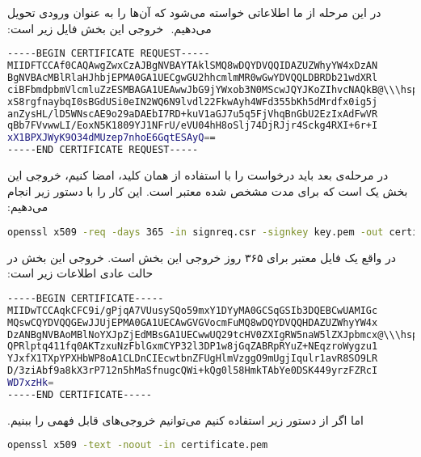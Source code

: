 ‫در این مرحله از ما اطلاعاتی خواسته می‌شود که آن‌ها را به عنوان ورودی تحویل می‌دهیم.
‫
‫خروجی این بخش فایل زیر است:
\begin{latin}
\begin{lstlisting}[language=bash]
-----BEGIN CERTIFICATE REQUEST-----
MIIDFTCCAf0CAQAwgZwxCzAJBgNVBAYTAklSMQ8wDQYDVQQIDAZUZWhyYW4xDzAN
BgNVBAcMBlRlaHJhbjEPMA0GA1UECgwGU2hhcmlmMR0wGwYDVQQLDBRDb21wdXRl
ciBFbmdpbmVlcmluZzESMBAGA1UEAwwJbG9jYWxob3N0MScwJQYJKoZIhvcNAQkB@\\\hspace*{4em}\large\vdots \setcounter{lstnumber}{14}@
xS8rgfnaybqI0sBGdUSi0eIN2WQ6N9lvdl22FkwAyh4WFd355bKh5dMrdfx0ig5j
anZysHL/lD5WNscAE9o29aDAEbI7RD+kuV1aGJ7u5q5FjVhqBnGbU2EzIxAdFwVR
qBb7FVvwwLI/EoxN5K1809YJ1NFrU/eVU04hH8oSlj74DjRJjr4Sckg4RXI+6r+I
xX1BPXJWyK9O34dMUzep7nhoE6GqtESAyQ==
-----END CERTIFICATE REQUEST-----
\end{lstlisting}
\end{latin}
‫
‫در مرحله‌ی بعد باید درخواست  را با استفاده از همان کلید، امضا کنیم، خروجی این بخش یک  است که برای مدت مشخص شده معتبر است. این کار را با دستور زیر انجام می‌دهیم:
‫
‫
\begin{latin}
\begin{lstlisting}[language=bash]
 openssl x509 -req -days 365 -in signreq.csr -signkey key.pem -out certificate.pem
\end{lstlisting}
\end{latin}

‫در واقع یک فایل  معتبر برای ۳۶۵ روز خروجی این بخش است.
‫خروجی این بخش در حالت عادی اطلاعات زیر است:
‫
\begin{latin}
\begin{lstlisting}[language=bash]
-----BEGIN CERTIFICATE-----
MIIDwTCCAqkCFC9i/gPjqA7VUusySQo59mxY1DYyMA0GCSqGSIb3DQEBCwUAMIGc
MQswCQYDVQQGEwJJUjEPMA0GA1UECAwGVGVocmFuMQ8wDQYDVQQHDAZUZWhyYW4x
DzANBgNVBAoMBlNoYXJpZjEdMBsGA1UECwwUQ29tcHV0ZXIgRW5naW5lZXJpbmcx@\\\hspace*{4em}\large\vdots \setcounter{lstnumber}{18}@
QPRlptq411fq0AKTzxuNzFblGxmCYP32l3DP1w8jGqZABRpRYuZ+NEqzroWygzu1
YJxfX1TXpYPXHbWP8oA1CLDnCIEcwtbnZFUgHlmVzggO9mUgjIqulr1avR8SO9LR
D/3ziAbf9a8kX3rP712n5hMaSfnugcQWi+kQg0l58HmkTAbYe0DSK449yrzFZRcI
WD7xzHk=
-----END CERTIFICATE-----
\end{lstlisting}
\end{latin}

‫اما اگر از دستور زیر استفاده کنیم می‌توانیم خروجی‌های قابل فهمی را ببنیم.
‫
\begin{latin}
\begin{lstlisting}[language=bash]
 openssl x509 -text -noout -in certificate.pem
\end{lstlisting}
\end{latin}

